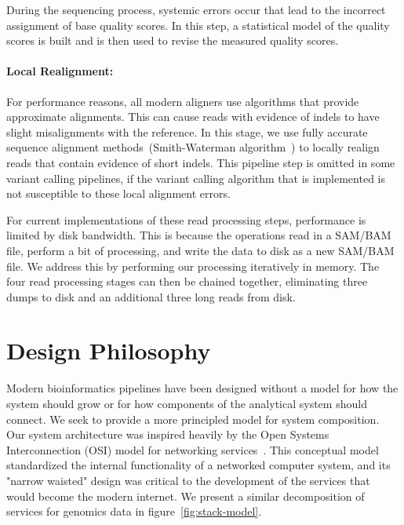 \documentclass[10pt,twocolumn]{article}
\theoremstyle{plain}
\begin{document}
During the sequencing process, systemic errors occur that lead to the incorrect assignment of base quality scores. In this step, a
statistical model of the quality scores is built and is then used to revise the measured quality scores.

\paragraph{Local Realignment:} 
\label{sec:local-realignment}

For performance reasons, all modern aligners use algorithms that provide approximate alignments. This can cause reads with
evidence of indels to have slight misalignments with the reference. In this stage, we use fully accurate sequence alignment
methods~(Smith-Waterman algorithm~\cite{smith81}) to locally realign reads that contain evidence of short indels. This pipeline
step is omitted in some variant calling pipelines, if the variant calling algorithm that is implemented is not susceptible to these
local alignment errors.

For current implementations of these read processing steps, performance is limited by disk bandwidth. This is because the operations
read in a SAM/BAM file, perform a bit of processing, and write the data to disk as a new SAM/BAM file. We address this by performing
our processing iteratively in memory. The four read processing stages can then be chained together, eliminating three dumps to
disk and an additional three long reads from disk. 

\section{Design Philosophy}
\label{sec:design-philosophy}

Modern bioinformatics pipelines have been designed without a model for how the system should grow or for how
components of the analytical system should connect. We seek to provide a more principled model for system composition.
Our system architecture was inspired heavily by the Open Systems Interconnection (OSI) model for networking
services~\cite{zimmermann80}. This conceptual model standardized the internal functionality of a networked
computer system, and its "narrow waisted" design was critical to the development of the services that would
become the modern internet. We present a similar decomposition of services for genomics data in
figure~\ref{fig:stack-model}.
\end{document}
